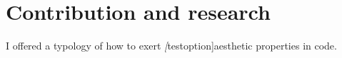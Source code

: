

\section{Contribution and research}

I offered a typology of how to exert \emph[testoption]{aesthetic properties} in code.


